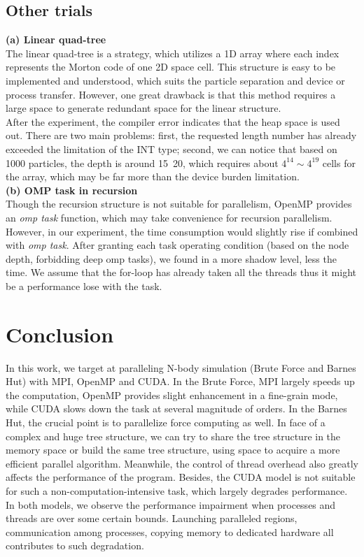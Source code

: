 \documentclass{scrartcl}
\begin{document}
\subsection{Other trials}
\noindent
\textbf{(a) Linear quad-tree}\\
The linear quad-tree is a strategy, which utilizes a 1D array where each index represents the Morton code of one 2D space cell. This structure is easy to be implemented and understood, which suits the particle separation and device or process transfer. However, one great drawback is that this method requires a large space to generate redundant space for the linear structure. \\ 
After the experiment, the compiler error indicates that the heap space is used out. There are two main problems: first, the requested length number has already exceeded the limitation of the INT type; second, we can notice that based on 1000 particles, the depth is around 15~20, which requires about $4^{14}\sim4^{19}$ cells for the array, which may be far more than the device burden limitation.\\
\textbf{(b) OMP task in recursion}\\
Though the recursion structure is not suitable for parallelism, OpenMP provides an \textit{omp task} function, which may take convenience for recursion parallelism. However, in our experiment, the time consumption would slightly rise if combined with \textit{omp task}. After granting each task operating condition (based on the node depth, forbidding deep omp tasks), we found in a more shadow level, less the time. We assume that the for-loop has already taken all the threads thus it might be a performance lose with the task.

\section{Conclusion}
In this work, we target at paralleling N-body simulation (Brute Force and Barnes Hut) with MPI, OpenMP and CUDA. 
In the Brute Force, MPI largely speeds up the computation, OpenMP provides slight enhancement in a fine-grain mode, while CUDA slows down the task at several magnitude of orders. 
In the Barnes Hut, the crucial point is to parallelize force computing as well. In face of a complex and huge tree structure, we can try to share the tree structure in the memory space or build the same tree structure, using space to acquire a more efficient parallel algorithm. Meanwhile, the control of thread overhead also greatly affects the performance of the program. Besides, the CUDA model is not suitable for such a non-computation-intensive task, which largely degrades performance.
In both models, we observe the performance impairment when processes and threads are over some certain bounds.
Launching paralleled regions, communication among processes, copying memory to dedicated hardware all contributes to such degradation.

\def \articleBIBLIOGRAPHY{bibliography.bib}
\printbibliography
\end{document}
